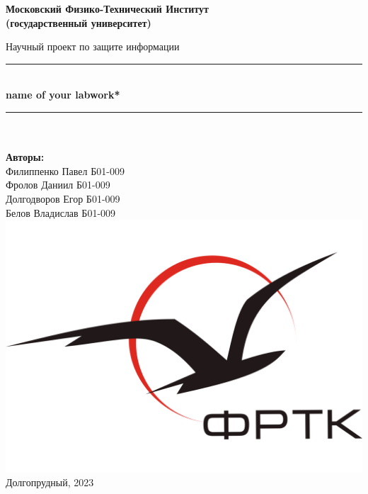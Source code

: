 \newcommand{\HRule}{\rule{\linewidth}{0.7mm}} %
	
	\begin{center}
		\large\textbf{Московский Физико-Технический Институт}\\ %
		\large\textbf{(государственный университет)}
	
		\vfill
		
		\Large Научный проект по защите информации\\[0.5cm] %
		
		
		\HRule
		\\[0.4cm]
		{ \huge \bfseries *name of your labwork*}%
		\\[0.4cm] 
		\HRule
		\\[0.5cm]
		
		\ \\
	\textbf{\large Авторы:} \\	
	\large Филиппенко Павел Б01-009\\ 
        \large Фролов Даниил Б01-009\\
        \large Долгодворов Егор Б01-009\\
        \large Белов Владислав Б01-009\\
		\vfill
		\hspace*{-0.8 cm}\includegraphics[width=100 pt]{../images/frkt_logo}\\ %
		\large Долгопрудный, 2023 %
	\end{center}

\newpage
\setcounter{page}{2}
\fancyfoot[c]{\thepage}
\fancyhead[R]{}